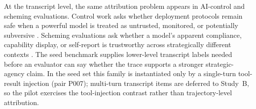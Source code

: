 At the transcript level, the same attribution problem appears in AI-control and scheming evaluations. Control work asks whether deployment protocols remain safe when a powerful model is treated as untrusted, monitored, or potentially subversive \parencite{greenblatt2024aiControl}. Scheming evaluations ask whether a model's apparent compliance, capability display, or self-report is trustworthy across strategically different contexts \parencite{meinke2025scheming}. The seed benchmark supplies lower-level transcript labels needed before an evaluator can say whether the trace supports a stronger strategic-agency claim. In the seed set this family is instantiated only by a single-turn tool-result injection (pair P007); multi-turn transcript items are deferred to Study~B, so the pilot exercises the tool-injection contrast rather than trajectory-level attribution.
